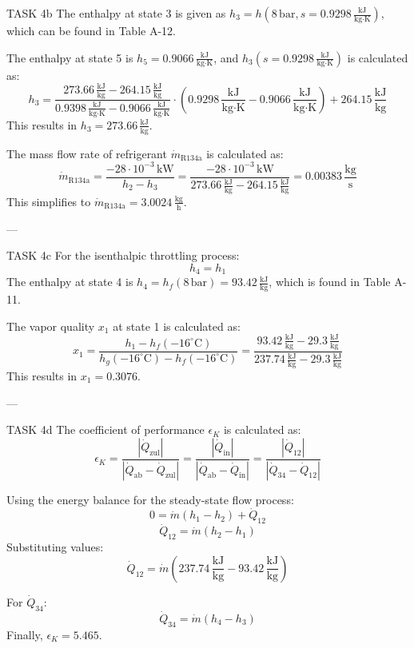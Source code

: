 TASK 4b  
The enthalpy at state 3 is given as \( h_3 = h(8 \, \text{bar}, s = 0.9298 \, \frac{\text{kJ}}{\text{kg·K}}) \), which can be found in Table A-12.  

The enthalpy at state 5 is \( h_5 = 0.9066 \, \frac{\text{kJ}}{\text{kg·K}} \), and \( h_3(s = 0.9298 \, \frac{\text{kJ}}{\text{kg·K}}) \) is calculated as:  
\[
h_3 = \frac{273.66 \, \frac{\text{kJ}}{\text{kg}} - 264.15 \, \frac{\text{kJ}}{\text{kg}}}{0.9398 \, \frac{\text{kJ}}{\text{kg·K}} - 0.9066 \, \frac{\text{kJ}}{\text{kg·K}}} \cdot (0.9298 \, \frac{\text{kJ}}{\text{kg·K}} - 0.9066 \, \frac{\text{kJ}}{\text{kg·K}}) + 264.15 \, \frac{\text{kJ}}{\text{kg}}  
\]
This results in \( h_3 = 273.66 \, \frac{\text{kJ}}{\text{kg}} \).  

The mass flow rate of refrigerant \( \dot{m}_{\text{R134a}} \) is calculated as:  
\[
\dot{m}_{\text{R134a}} = \frac{-28 \cdot 10^{-3} \, \text{kW}}{h_2 - h_3} = \frac{-28 \cdot 10^{-3} \, \text{kW}}{273.66 \, \frac{\text{kJ}}{\text{kg}} - 264.15 \, \frac{\text{kJ}}{\text{kg}}} = 0.00383 \, \frac{\text{kg}}{\text{s}}
\]
This simplifies to \( \dot{m}_{\text{R134a}} = 3.0024 \, \frac{\text{kg}}{\text{h}} \).  

---

TASK 4c  
For the isenthalpic throttling process:  
\[
h_4 = h_1
\]
The enthalpy at state 4 is \( h_4 = h_f(8 \, \text{bar}) = 93.42 \, \frac{\text{kJ}}{\text{kg}} \), which is found in Table A-11.  

The vapor quality \( x_1 \) at state 1 is calculated as:  
\[
x_1 = \frac{h_1 - h_f(-16^\circ \text{C})}{h_g(-16^\circ \text{C}) - h_f(-16^\circ \text{C})} = \frac{93.42 \, \frac{\text{kJ}}{\text{kg}} - 29.3 \, \frac{\text{kJ}}{\text{kg}}}{237.74 \, \frac{\text{kJ}}{\text{kg}} - 29.3 \, \frac{\text{kJ}}{\text{kg}}}
\]
This results in \( x_1 = 0.3076 \).  

---

TASK 4d  
The coefficient of performance \( \epsilon_K \) is calculated as:  
\[
\epsilon_K = \frac{|\dot{Q}_{\text{zul}}|}{|\dot{Q}_{\text{ab}} - \dot{Q}_{\text{zul}}|} = \frac{|\dot{Q}_{\text{in}}|}{|\dot{Q}_{\text{ab}} - \dot{Q}_{\text{in}}|} = \frac{|\dot{Q}_{12}|}{|\dot{Q}_{34} - \dot{Q}_{12}|}
\]

Using the energy balance for the steady-state flow process:  
\[
0 = \dot{m}(h_1 - h_2) + \dot{Q}_{12}
\]
\[
\dot{Q}_{12} = \dot{m}(h_2 - h_1)
\]
Substituting values:  
\[
\dot{Q}_{12} = \dot{m}(237.74 \, \frac{\text{kJ}}{\text{kg}} - 93.42 \, \frac{\text{kJ}}{\text{kg}})
\]

For \( \dot{Q}_{34} \):  
\[
\dot{Q}_{34} = \dot{m}(h_4 - h_3)
\]
Finally, \( \epsilon_K = 5.465 \).  